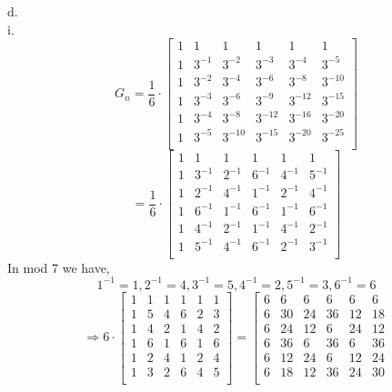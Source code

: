 \documentclass[11pt]{article}
\begin{document}
\begin{itemize}
d.\\
\phantom{d.} i.
 \[
   G_n = \frac{1}{6} \cdot
  \left[ {\begin{array}{cccccc}
   1 & 1 & 1 & 1 & 1 & 1\\
   1 & 3^{-1} & 3^{-2} & 3^{-3} & 3^{-4} & 3^{-5}\\
   1 & 3^{-2} & 3^{-4} & 3^{-6} & 3^{-8} & 3^{-10}\\
   1 & 3^{-3} & 3^{-6} & 3^{-9} & 3^{-12} & 3^{-15}\\
   1 & 3^{-4} & 3^{-8} & 3^{-12} & 3^{-16} & 3^{-20}\\
   1 & 3^{-5} & 3^{-10} & 3^{-15} & 3^{-20} & 3^{-25}\\
  \end{array} } \right]
\]
 \[
  = \frac{1}{6} \cdot
   \left[ {\begin{array}{cccccc}
   1 & 1 & 1 & 1 & 1 & 1\\
   1 & 3^{-1} & 2^{-1} & 6^{-1} & 4^{-1} & 5^{-1}\\
   1 & 2^{-1} & 4^{-1} & 1^{-1} & 2^{-1} & 4^{-1}\\
   1 & 6^{-1} & 1^{-1} & 6^{-1} & 1^{-1} & 6^{-1}\\
   1 & 4^{-1} & 2^{-1} & 1^{-1} & 4^{-1} & 2^{-1}\\
   1 & 5^{-1} & 4^{-1} & 6^{-1} & 2^{-1} & 3^{-1}\\
  \end{array} } \right]
  \]
In mod 7 we have,
$$1^{-1} = 1, 2^{-1} = 4, 3^{-1} = 5, 4^{-1} = 2, 5^{-1} = 3, 6^{-1} = 6$$
  \[
 	\Rightarrow 6 \cdot
 \left[ {\begin{array}{cccccc}
   1 & 1 & 1 & 1 & 1 & 1\\
   1 & 5 & 4 & 6 & 2 & 3\\
   1 & 4 & 2 & 1 & 4 & 2\\
   1 & 6 & 1 & 6 & 1 & 6\\
   1 & 2 & 4 & 1 & 2 & 4\\
   1 & 3 & 2 & 6 & 4 & 5\\
  \end{array} } \right]
  = 
   \left[ {\begin{array}{cccccc}
   6 & 6 & 6 & 6 & 6 & 6\\
   6 & 30 & 24 & 36 & 12 & 18\\
   6 & 24 & 12 & 6 & 24 & 12\\
   6 & 36 & 6 & 36 & 6 & 36\\
   6 & 12 & 24 & 6 & 12 & 24\\
   6 & 18 & 12 & 36 & 24 & 30\\

\end{array}}\]
\end{itemize}
\end{document}
